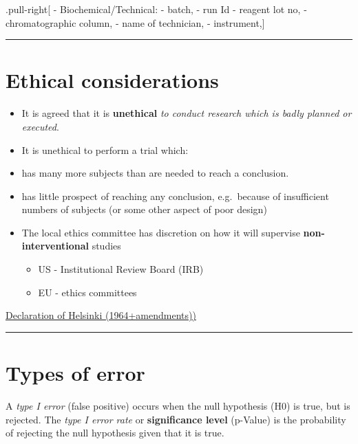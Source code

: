\documentclass[]{article}
\providecommand{\tightlist}{%
  \setlength{\itemsep}{0pt}\setlength{\parskip}{0pt}}
\begin{document}
.pull-right{[} - Biochemical/Technical: - batch, - run Id - reagent lot
no, - chromatographic column, - name of technician, - instrument,{]}

\begin{center}\rule{0.5\linewidth}{\linethickness}\end{center}

\hypertarget{ethical-considerations}{%
\section{Ethical considerations}\label{ethical-considerations}}

\begin{itemize}
\item
  It is agreed that it is \textbf{unethical} \emph{to conduct research
  which is badly planned or executed}.
\item
  It is unethical to perform a trial which:
\item
  has many more subjects than are needed to reach a conclusion.
\item
  has little prospect of reaching any conclusion, e.g.~because of
  insufficient numbers of subjects (or some other aspect of poor design)
\item
  The local ethics committee has discretion on how it will supervise
  \textbf{non-interventional} studies

  \begin{itemize}
  \tightlist
  \item
    US - Institutional Review Board (IRB)
  \item
    EU - ethics committees
  \end{itemize}
\end{itemize}

\href{https://www.wma.net/policies-post/wma-declaration-of-helsinki-ethical-principles-for-medical-research-involving-human-subjects/}{Declaration
of Helsinki (1964+amendments))}

\begin{center}\rule{0.5\linewidth}{\linethickness}\end{center}

\hypertarget{types-of-error}{%
\section{Types of error}\label{types-of-error}}

A \emph{type I error} (false positive) occurs when the null hypothesis
(H0) is true, but is rejected. The \emph{type I error rate} or
\textbf{significance level} (p-Value) is the probability of rejecting
the null hypothesis given that it is true.
\end{document}
